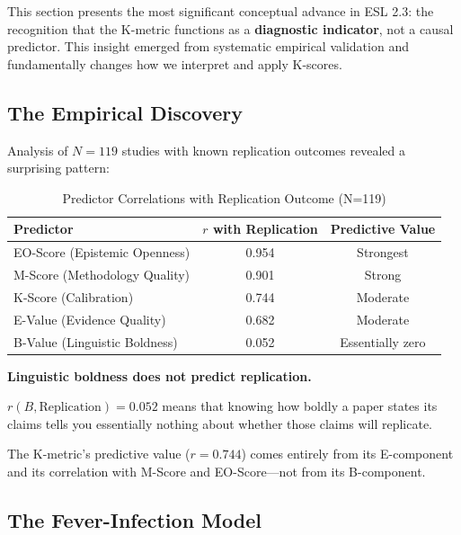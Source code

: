 \documentclass[11pt,a4paper]{article}
\theoremstyle{remark}
\begin{document}
This section presents the most significant conceptual advance in ESL 2.3: the recognition that the K-metric functions as a \textbf{diagnostic indicator}, not a causal predictor. This insight emerged from systematic empirical validation and fundamentally changes how we interpret and apply K-scores.

\subsection{The Empirical Discovery}

Analysis of $N = 119$ studies with known replication outcomes revealed a surprising pattern:

\begin{table}[h]
\centering
\caption{Predictor Correlations with Replication Outcome (N=119)}
\label{tab:predictor-ranking-ch2}
\begin{tabular}{lcc}
\toprule
\textbf{Predictor} & \textbf{$r$ with Replication} & \textbf{Predictive Value} \\
\midrule
EO-Score (Epistemic Openness) & 0.954 & \textcolor{eslgreen}{Strongest} \\
M-Score (Methodology Quality) & 0.901 & \textcolor{eslgreen}{Strong} \\
K-Score (Calibration) & 0.744 & Moderate \\
E-Value (Evidence Quality) & 0.682 & Moderate \\
\midrule
B-Value (Linguistic Boldness) & 0.052 & \textcolor{eslred}{Essentially zero} \\
\bottomrule
\end{tabular}
\end{table}

\begin{keyinsight}[title={The Central Finding}]
\textbf{Linguistic boldness does not predict replication.}

$r(B, \text{Replication}) = 0.052$ means that knowing how boldly a paper states its claims tells you essentially nothing about whether those claims will replicate.

The K-metric's predictive value ($r = 0.744$) comes entirely from its E-component and its correlation with M-Score and EO-Score---not from its B-component.
\end{keyinsight}

\subsection{The Fever-Infection Model}
\end{document}
